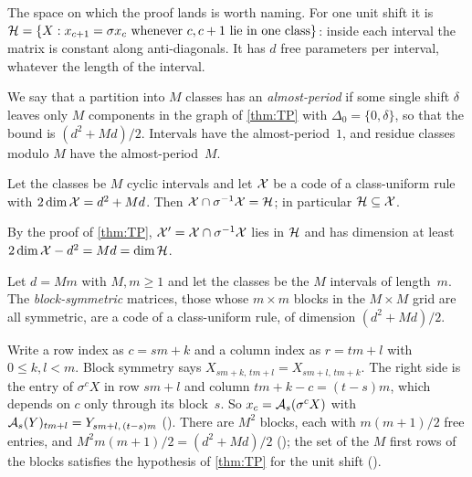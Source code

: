 The space on which the proof lands is worth naming. For one unit shift it is
$\mathcal{H}=\{X:x_{c+1}=\sigma x_c\text{ whenever }c,c+1\text{ lie in one class}\}$: inside each interval the matrix is constant
along anti-diagonals. It has $d$ free parameters per interval, whatever the length of the interval.

We say that a partition into $M$ classes has an \emph{almost-period} if some single shift $\delta$ leaves only $M$
components in the graph of \cref{thm:TP} with $\Delta_0=\{0,\delta\}$, so that the bound is $(d^2+Md)/2$. Intervals have
the almost-period~$1$, and residue classes modulo $M$ have the almost-period~$M$.

\begin{lemma}\label{lem:extremal}
\notformalized
Let the classes be $M$ cyclic intervals and let $\mathcal{X}$ be a code of a class-uniform rule with $2\dim\mathcal{X}=d^2+Md$. Then
$\mathcal{X}\cap\sigma^{-1}\mathcal{X}=\mathcal{H}$; in particular $\mathcal{H}\subseteq\mathcal{X}$.
\end{lemma}

\begin{informalproof}
By the proof of \cref{thm:TP}, $\mathcal{X}'=\mathcal{X}\cap\sigma^{-1}\mathcal{X}$ lies in $\mathcal{H}$ and has dimension at least
$2\dim\mathcal{X}-d^2=Md=\dim\mathcal{H}$.
\end{informalproof}

\begin{proposition}\label{prop:block-symmetric}
Let $d=Mm$ with $M,m\ge1$ and let the classes be the $M$ intervals of length~$m$. The \emph{block-symmetric} matrices,
those whose $m\times m$ blocks in the $M\times M$ grid are all symmetric, are a code of a class-uniform rule, of
dimension $(d^2+Md)/2$.
\end{proposition}

\begin{outline}
Write a row index as $c=sm+k$ and a column index as $r=tm+l$ with $0\le k,l<m$. Block symmetry says
$X_{sm+k,\,tm+l}=X_{sm+l,\,tm+k}$. The right side is the entry of $\sigma^cX$ in row $sm+l$ and column
$tm+k-c=(t-s)m$, which depends on $c$ only through its block~$s$. So $x_c=\mathcal{A}_s(\sigma^cX)$ with
$\mathcal{A}_s(Y)_{tm+l}=Y_{sm+l,\,(t-s)m}$ (). There are $M^2$ blocks, each with
$m(m+1)/2$ free entries, and $M^2m(m+1)/2=(d^2+Md)/2$ (); the set of the $M$
first rows of the blocks satisfies the hypothesis of \cref{thm:TP} for the unit shift
().
\end{outline}

